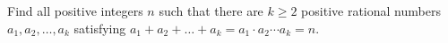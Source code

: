 Find all positive integers $n$ such that there are $k \geq 2$ positive rational numbers $a_1, a_2, \ldots, a_k$ satisfying $a_1 + a_2 + \ldots + a_k = a_1 \cdot a_2 \cdots a_k = n.$